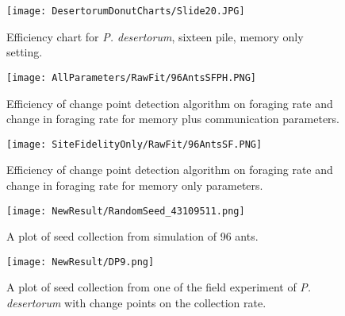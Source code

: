 \begin{figure}[h]
	\texttt{[image: DesertorumDonutCharts/Slide20.JPG]}
	\caption{Efficiency chart for \textit{P. desertorum}, sixteen pile,  memory only setting.}
\end{figure}
\begin{figure}[h]
	\texttt{[image: AllParameters/RawFit/96AntsSFPH.PNG]}
	\caption{Efficiency of change point detection algorithm on foraging rate and change in foraging rate for memory plus communication parameters.}
\end{figure}
\begin{figure}[h]
	\texttt{[image: SiteFidelityOnly/RawFit/96AntsSF.PNG]}
	\caption{Efficiency of change point detection algorithm on foraging rate and change in foraging rate for memory only parameters.}
\end{figure}
\begin{figure}[h]
	\texttt{[image: NewResult/RandomSeed\_43109511.png]}
	\caption{A plot of seed collection from simulation of 96 ants.}
\end{figure}
\begin{figure}[h]
	\texttt{[image: NewResult/DP9.png]}
	\caption{A plot of seed collection from one of the field experiment of \textit{P. desertorum} with change points on the collection rate.}
\end{figure}
